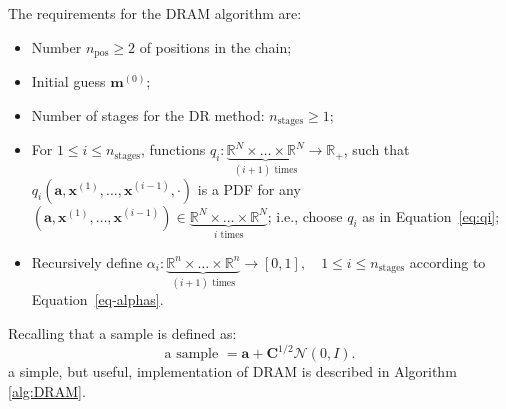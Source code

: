 
The requirements for the DRAM algorithm are:
\begin{itemize}
 \item Number $n_{\text{pos}}\geqslant 2$ of positions in the chain;
 \item Initial guess $\mathbf{m}^{(0)}$;
 \item Number of stages for the DR method: $n_{\text{stages}}\geqslant 1$;
 \item For $1\leqslant i\leqslant n_{\text{stages}}$, functions $q_i:\underbrace{\mathbb{R}^N\times\ldots\times\mathbb{R}^N}_{(i+1)\text{ times}}\rightarrow\mathbb{R}_{+}$, such that $q_i(\mathbf{a},\mathbf{x}^{(1)},\ldots,\mathbf{x}^{(i-1)},\cdot)$ is a PDF for any $(\mathbf{a},\mathbf{x}^{(1)},\ldots,\mathbf{x}^{(i-1)})\in\underbrace{\mathbb{R}^N\times\ldots\times\mathbb{R}^N}_{i\text{ times}}$; i.e., choose $q_i$ as in Equation~\eqref{eq:qi};
 \item Recursively define $\alpha_i:\underbrace{\mathbb{R}^n\times\ldots\times\mathbb{R}^n}_{(i+1)\text{ times}}\rightarrow [0,1],\quad 1\leqslant i\leqslant n_{\text{stages}}$ according to Equation~\eqref{eq-alphas}.
\end{itemize}

% 

Recalling that a sample is defined as:
\begin{equation*} %
\text{a sample } = \mathbf{a}+\mathbf{C}^{1/2}\mathcal{N}(0,I).
\end{equation*}
a simple, but useful, implementation of DRAM is described in Algorithm \ref{alg:DRAM}.
 

